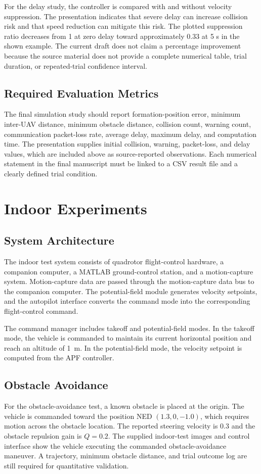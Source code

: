 \documentclass[journal]{IEEEtran}
\begin{document}
For the delay study, the controller is compared with and without velocity suppression. The presentation indicates that severe delay can increase collision risk and that speed reduction can mitigate this risk. The plotted suppression ratio decreases from 1 at zero delay toward approximately 0.33 at 5 s in the shown example. The current draft does not claim a percentage improvement because the source material does not provide a complete numerical table, trial duration, or repeated-trial confidence interval.

\subsection{Required Evaluation Metrics}
The final simulation study should report formation-position error, minimum inter-UAV distance, minimum obstacle distance, collision count, warning count, communication packet-loss rate, average delay, maximum delay, and computation time. The presentation supplies initial collision, warning, packet-loss, and delay values, which are included above as source-reported observations. Each numerical statement in the final manuscript must be linked to a CSV result file and a clearly defined trial condition.

\section{Indoor Experiments}
\label{sec:experiments}
\subsection{System Architecture}
The indoor test system consists of quadrotor flight-control hardware, a companion computer, a MATLAB ground-control station, and a motion-capture system. Motion-capture data are passed through the motion-capture data bus to the companion computer. The potential-field module generates velocity setpoints, and the autopilot interface converts the command mode into the corresponding flight-control command.

The command manager includes takeoff and potential-field modes. In the takeoff mode, the vehicle is commanded to maintain its current horizontal position and reach an altitude of \SI{1}{m}. In the potential-field mode, the velocity setpoint is computed from the APF controller.

\subsection{Obstacle Avoidance}
For the obstacle-avoidance test, a known obstacle is placed at the origin. The vehicle is commanded toward the position NED $(1.3,0,-1.0)$, which requires motion across the obstacle location. The reported steering velocity is 0.3 and the obstacle repulsion gain is $Q=0.2$. The supplied indoor-test images and control interface show the vehicle executing the commanded obstacle-avoidance maneuver. A trajectory, minimum obstacle distance, and trial outcome log are still required for quantitative validation.
\end{document}
